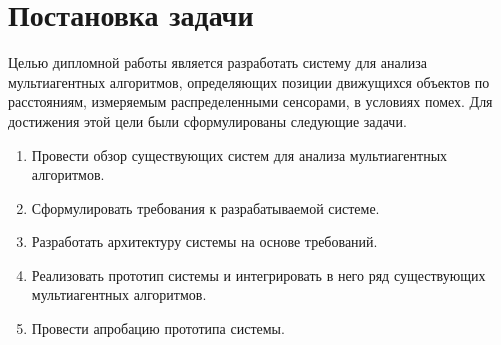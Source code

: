
\section{Постановка задачи}
\label{sec:task}
Целью дипломной работы является разработать систему для анализа мультиагентных алгоритмов, определяющих позиции движущихся объектов по расстояниям, измеряемым распределенными сенсорами, в условиях помех. Для достижения этой цели были сформулированы следующие задачи.
\begin{enumerate}
    \item Провести обзор существующих систем для анализа мультиагентных алгоритмов.
    \item Сформулировать требования к разрабатываемой системе.
    \item Разработать архитектуру системы на основе требований.
    \item Реализовать прототип системы и интегрировать в него ряд существующих мультиагентных алгоритмов.
    \item Провести апробацию прототипа системы.
\end{enumerate}